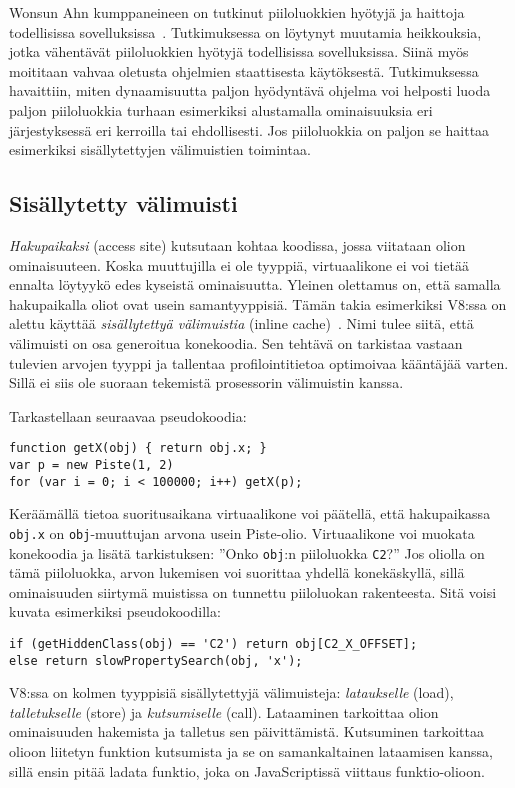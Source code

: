 Wonsun Ahn kumppaneineen on tutkinut piiloluokkien hyötyjä ja haittoja todellisissa sovelluksissa~\cite{Ahn2014}. Tutkimuksessa on löytynyt muutamia heikkouksia, jotka vähentävät piiloluokkien hyötyjä todellisissa sovelluksissa. Siinä myös moititaan vahvaa oletusta ohjelmien staattisesta käytöksestä. Tutkimuksessa havaittiin, miten dynaamisuutta paljon hyödyntävä ohjelma voi helposti luoda paljon piiloluokkia turhaan esimerkiksi alustamalla ominaisuuksia eri järjestyksessä eri kerroilla tai ehdollisesti. Jos piiloluokkia on paljon se haittaa esimerkiksi sisällytettyjen välimuistien toimintaa.

\subsection{Sisällytetty välimuisti}

\textit{Hakupaikaksi} (access site) kutsutaan kohtaa koodissa, jossa viitataan olion ominaisuuteen. Koska muuttujilla ei ole tyyppiä, virtuaalikone ei voi tietää ennalta löytyykö edes kyseistä ominaisuutta. Yleinen olettamus on, että samalla hakupaikalla oliot ovat usein samantyyppisiä. Tämän takia esimerkiksi V8:ssa on alettu käyttää \textit{sisällytettyä välimuistia} (inline cache)~\cite[s.~498]{Ahn2014}. Nimi tulee siitä, että välimuisti on osa generoitua konekoodia. Sen tehtävä on tarkistaa vastaan tulevien arvojen tyyppi ja tallentaa profilointitietoa optimoivaa kääntäjää varten. Sillä ei siis ole suoraan tekemistä prosessorin välimuistin kanssa.

Tarkastellaan seuraavaa pseudokoodia:
\begin{lstlisting}
function getX(obj) { return obj.x; }
var p = new Piste(1, 2)
for (var i = 0; i < 100000; i++) getX(p);
\end{lstlisting}
Keräämällä tietoa suoritusaikana virtuaalikone voi päätellä, että hakupaikassa \texttt{obj.x} on \texttt{obj}-muuttujan arvona usein Piste-olio. Virtuaalikone voi muokata konekoodia ja lisätä tarkistuksen: ''Onko \texttt{obj}:n piiloluokka \texttt{C2}?'' Jos oliolla on tämä piiloluokka, arvon lukemisen voi suorittaa yhdellä konekäskyllä, sillä ominaisuuden siirtymä muistissa on tunnettu piiloluokan rakenteesta. Sitä voisi kuvata esimerkiksi pseudokoodilla:
\begin{lstlisting}
if (getHiddenClass(obj) == 'C2') return obj[C2_X_OFFSET];
else return slowPropertySearch(obj, 'x');
\end{lstlisting}

V8:ssa on kolmen tyyppisiä sisällytettyjä välimuisteja: \textit{lataukselle} (load), \textit{talletukselle} (store) ja \textit{kutsumiselle} (call). Lataaminen tarkoittaa olion ominaisuuden hakemista ja talletus sen päivittämistä. Kutsuminen tarkoittaa olioon liitetyn funktion kutsumista ja se on samankaltainen lataamisen kanssa, sillä ensin pitää ladata funktio, joka on JavaScriptissä viittaus funktio-olioon.

